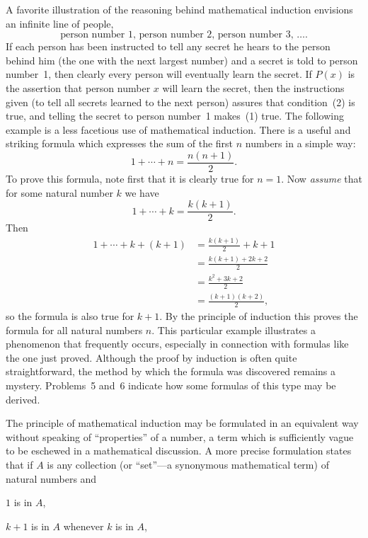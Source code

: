 A favorite illustration of the reasoning behind mathematical induction
envisions an infinite line of people,
\[ \text{person number 1, person number 2, person number 3, } \dots. \]
If each person has been instructed to tell any secret he hears to the person
behind him (the one with the next largest number) and a secret is told to
person number~1, then clearly every person will eventually learn the secret.
If $P(x)$ is the assertion that person number $x$ will learn the secret, then
the instructions given (to tell all secrets learned to the next person)
assures that condition~(2) is true, and telling the secret to person number~1
makes~(1) true. The following example is a less facetious use of mathematical
induction. There is a useful and striking formula which expresses the sum of
the first $n$ numbers in a simple way:
\[
1 + \cdots + n = \frac{n(n+1)}{2}.
\]
To prove this formula, note first that it is clearly true for $n = 1$. Now
\emph{assume} that for some natural number $k$ we have
\[
1 + \cdots + k = \frac{k(k+1)}{2}.
\]
Then
\begin{align*}
1 + \cdots + k + (k+1)
  &= \frac{k(k+1)}{2} + k + 1\\
  &= \frac{k(k+1) + 2k + 2}{2}\\
  &= \frac{k^2 + 3k + 2}{2}\\
  &= \frac{(k+1)(k+2)}{2},
\end{align*}
so the formula is also true for $k + 1$. By the principle of induction this
proves the formula for all natural numbers $n$. This particular example
illustrates a phenomenon that frequently occurs, especially in connection
with formulas like the one just proved. Although the proof by induction is
often quite straightforward, the method by which the formula was discovered
remains a mystery. Problems~5 and~6 indicate how some formulas of this type
may be derived.

The principle of mathematical induction may be formulated in an equivalent
way without speaking of ``properties'' of a number, a term which is
sufficiently vague to be eschewed in a mathematical discussion. A more precise
formulation states that if $A$ is any collection (or ``set''---a synonymous
mathematical term) of natural numbers and

\begin{steps}
\item $1$ is in $A$,
\item $k + 1$ is in $A$ whenever $k$ is in $A$,
\end{steps}

